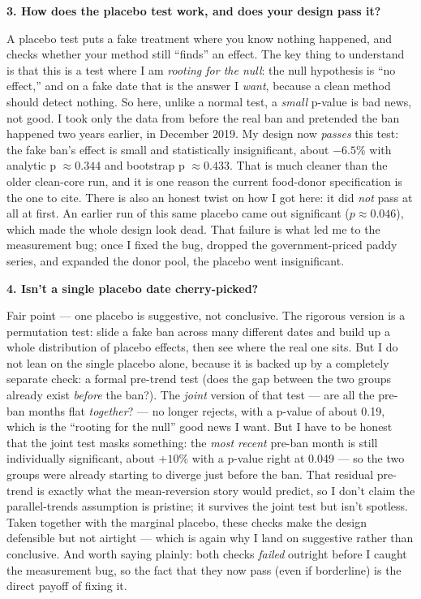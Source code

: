 \documentclass[11pt]{article}
\newcommand{\Q}[1]{\medskip\noindent\textbf{#1}\par}
\newcommand{\A}{\noindent}
\begin{document}
\Q{3. How does the placebo test work, and does your design pass it?}
\A A placebo test puts a fake treatment where you know nothing happened, and checks whether your
method still ``finds'' an effect. The key thing to understand is that this is a test where I am
\emph{rooting for the null}: the null hypothesis is ``no effect,'' and on a fake date that is the
answer I \emph{want}, because a clean method should detect nothing. So here, unlike a normal test, a
\emph{small} p-value is bad news, not good. I took only the data from before the real ban and
pretended the ban happened two years earlier, in December 2019. My design now \emph{passes} this test:
the fake ban's effect is small and statistically insignificant, about $-6.5\%$ with analytic
p $\approx 0.344$ and bootstrap p $\approx 0.433$. That is much cleaner than the older clean-core run,
and it is one reason the current food-donor specification is the one to cite. There is also an honest
twist on how I got here: it did \emph{not} pass at all at first. An earlier run of this same placebo
came out significant ($p \approx 0.046$), which made the whole design look dead. That failure is what
led me to the measurement bug; once I fixed the bug, dropped the government-priced paddy series, and
expanded the donor pool, the placebo went insignificant.

\Q{4. Isn't a single placebo date cherry-picked?}
\A Fair point --- one placebo is suggestive, not conclusive. The rigorous version is a permutation
test: slide a fake ban across many different dates and build up a whole distribution of placebo
effects, then see where the real one sits. But I do not lean on the single placebo alone, because it
is backed up by a completely separate check: a formal pre-trend test (does the gap between the two
groups already exist \emph{before} the ban?). The \emph{joint} version of that test --- are all the
pre-ban months flat \emph{together}? --- no longer rejects, with a p-value of about 0.19, which is
the ``rooting for the null'' good news I want. But I have to be honest that the joint test masks
something: the \emph{most recent} pre-ban month is still individually significant, about $+10\%$ with
a p-value right at 0.049 --- so the two groups were already starting to diverge just before the ban.
That residual pre-trend is exactly what the mean-reversion story would predict, so I don't claim the
parallel-trends assumption is pristine; it survives the joint test but isn't spotless. Taken together
with the marginal placebo, these checks make the design defensible but not airtight --- which is
again why I land on suggestive rather than conclusive. And worth saying plainly: both checks
\emph{failed} outright before I caught the measurement bug, so the fact that they now pass (even if
borderline) is the direct payoff of fixing it.
\end{document}
